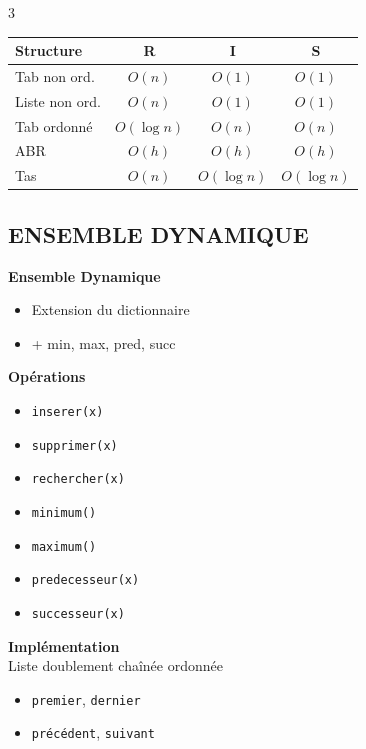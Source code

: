 \documentclass[10pt,a4paper,landscape]{article}
\begin{document}
\begin{multicols}{3}
\begin{complexbox}
\small
\begin{tabular}{lccc}
\textbf{Structure} & \textbf{R} & \textbf{I} & \textbf{S} \\
\hline
Tab non ord. & $O(n)$ & $O(1)$ & $O(1)$ \\
Liste non ord. & $O(n)$ & $O(1)$ & $O(1)$ \\
Tab ordonné & $O(\log n)$ & $O(n)$ & $O(n)$ \\
ABR & $O(h)$ & $O(h)$ & $O(h)$ \\
Tas & $O(n)$ & $O(\log n)$ & $O(\log n)$ \\
\end{tabular}
\end{complexbox}

\subsection*{ENSEMBLE DYNAMIQUE}

\begin{defbox}
\textbf{Ensemble Dynamique}
\begin{itemize}
\item Extension du dictionnaire
\item + min, max, pred, succ
\end{itemize}
\end{defbox}

\begin{algobox}
\textbf{Opérations}
\begin{itemize}
\item \texttt{inserer(x)}
\item \texttt{supprimer(x)}
\item \texttt{rechercher(x)}
\item \texttt{minimum()}
\item \texttt{maximum()}
\item \texttt{predecesseur(x)}
\item \texttt{successeur(x)}
\end{itemize}
\end{algobox}

\begin{importbox}
\textbf{Implémentation}\\
Liste doublement chaînée ordonnée
\begin{itemize}
\item \texttt{premier}, \texttt{dernier}
\item \texttt{précédent}, \texttt{suivant}
\end{itemize}
\end{importbox}


\end{multicols}
\end{document}
